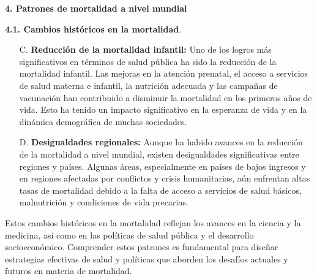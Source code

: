 \documentclass[8pt,a4paper]{beamer}
\begin{document}
{\begin{frame}{\textbf{4. Patrones de mortalidad a nivel mundial}}
\begin{block}{\textbf{4.1. Cambios históricos en la mortalidad}.}
\begin{enumerate}
\end{enumerate}
\end{block}
\end{frame}

\begin{frame}{}
\setlength{\parskip}{3px}
\justifying
\begin{block}{}
\setlength{\parskip}{3px}
\justifying
\begin{enumerate}
\setlength{\parskip}{3px}
\justifying
\item[C.] \textbf{Reducción de la mortalidad infantil:} Uno de los logros más significativos en términos de salud pública ha sido la reducción de la mortalidad infantil. Las mejoras en la atención prenatal, el acceso a servicios de salud materna e infantil, la nutrición adecuada y las campañas de vacunación han contribuido a disminuir la mortalidad en los primeros años de vida. Esto ha tenido un impacto significativo en la esperanza de vida y en la dinámica demográfica de muchas sociedades.

\item[D.] \textbf{Desigualdades regionales:} Aunque ha habido avances en la reducción de la mortalidad a nivel mundial, existen desigualdades significativas entre regiones y países. Algunas áreas, especialmente en países de bajos ingresos y en regiones afectadas por conflictos y crisis humanitarias, aún enfrentan altas tasas de mortalidad debido a la falta de acceso a servicios de salud básicos, malnutrición y condiciones de vida precarias.

\end{enumerate}
Estos cambios históricos en la mortalidad reflejan los avances en la ciencia y la medicina, así como en las políticas de salud pública y el desarrollo socioeconómico. Comprender estos patrones es fundamental para diseñar estrategias efectivas de salud y políticas que aborden los desafíos actuales y futuros en materia de mortalidad.
\end{block}
\end{frame}

}
\end{document}
